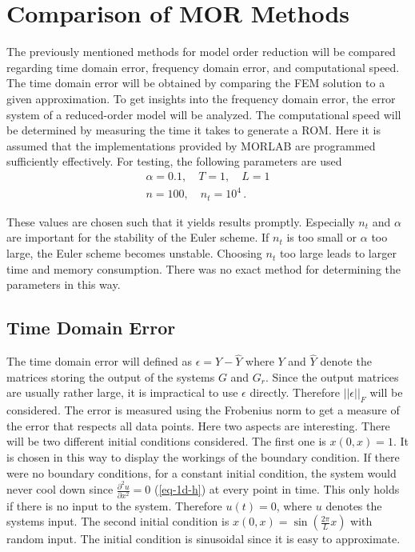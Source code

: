 \chapter{Comparison of MOR Methods} \label{analysis}
The previously mentioned methods for model order reduction will be compared regarding time domain error, frequency domain error, and computational speed.
The time domain error will be obtained by comparing the FEM solution to a given approximation.
To get insights into the frequency domain error, the error system of a reduced-order model will be analyzed.
The computational speed will be determined by measuring the time it takes to generate a ROM.
Here it is assumed that the implementations provided by MORLAB are programmed sufficiently effectively.
For testing, the following parameters are used
\begin{gather}
\alpha = 0.1, \quad T = 1, \quad L = 1 \\
n = 100, \quad n_t = 10^{4} \,.
\end{gather}


These values are chosen such that it yields results promptly.
Especially \(n_t\) and \(\alpha\) are important for the stability of the Euler scheme.
If \(n_t\) is too small or \(\alpha\) too large, the Euler scheme becomes unstable.
Choosing \(n_t\) too large leads to larger time and memory consumption.
There was no exact method for determining the parameters in this way.

\section{Time Domain Error}
The time domain error will defined as \(\epsilon = Y - \hat{Y}\) where \(Y\) and \(\hat{Y}\) denote the matrices storing the output of the systems \(G\) and \(G_r\).
Since the output matrices are usually rather large, it is impractical to use \(\epsilon\) directly.
Therefore  \(||\epsilon||_{F}\) will be considered.
The error is measured using the Frobenius norm to get a measure of the error that respects all data points.
Here two aspects are interesting.
There will be two different initial conditions considered.
The first one is \(x(0, x) = 1\).
It is chosen in this way to display the workings of the boundary condition.
If there were no boundary conditions, for a constant initial condition, the system would never cool down since \(\frac{\partial^2 u}{\partial x^2} = 0\) (\ref{eq-1d-h}) at every point in time.
This only holds if there is no input to the system.
Therefore \(u(t) = 0\), where \(u\) denotes the systems input.
The second initial condition is \(x(0, x) = \sin(\frac{2\pi}{L}x)\) with random input.
The initial condition is sinusoidal since it is easy to approximate.

